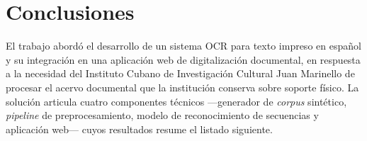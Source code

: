 \chapter*{Conclusiones}
\label{chap:conclusions}

El trabajo abordó el desarrollo de un sistema OCR para texto impreso en español y su integración en una aplicación web de digitalización documental, en respuesta a la necesidad del Instituto Cubano de Investigación Cultural Juan Marinello de procesar el acervo documental que la institución conserva sobre soporte físico. La solución articula cuatro componentes técnicos —generador de \textit{corpus} sintético, \textit{pipeline} de preprocesamiento, modelo de reconocimiento de secuencias y aplicación web— cuyos resultados resume el listado siguiente.

